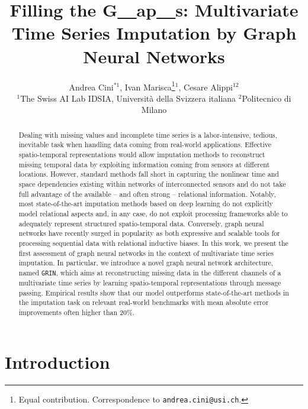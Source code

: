 \documentclass{article} \usepackage{iclr2022_conference,times}
\title{Filling the G\underline{~~}ap\underline{~~}s: Multivariate Time Series Imputation by Graph Neural Networks}
\author{Andrea Cini$^{*1}$, Ivan Marisca\thanks{Equal contribution. Correspondence to \texttt{andrea.cini@usi.ch}.}\hspace{1.5mm}$^{1}$, Cesare Alippi${}^{12}$\\
${}^1$The Swiss AI Lab IDSIA, Universit\`a della Svizzera italiana ${}^2$Politecnico di Milano
}
\newcommand{\GRIL}{\texttt{GRIN}}
\begin{document}
\maketitle

\begin{abstract}
Dealing with missing values and incomplete time series is a labor-intensive, tedious, inevitable task when handling data coming from real-world applications. Effective spatio-temporal representations would allow imputation methods to reconstruct missing temporal data by exploiting information coming from sensors at different locations. However, standard methods fall short in capturing the nonlinear time and space dependencies existing within networks of interconnected sensors and do not take full advantage of the available -- and often strong -- relational information. Notably, most state-of-the-art imputation methods based on deep learning do not explicitly model relational aspects and, in any case, do not exploit processing frameworks able to adequately represent structured spatio-temporal data.
Conversely, graph neural networks have recently surged in popularity as both expressive and scalable tools for processing sequential data with relational inductive biases. In this work, we present the first assessment of graph neural networks in the context of multivariate time series imputation. In particular, we introduce a novel graph neural network architecture, named \GRIL, which aims at reconstructing missing data in the different channels of a multivariate time series by learning spatio-temporal representations through message passing. Empirical results show that our model outperforms state-of-the-art methods in the imputation task on relevant real-world benchmarks with mean absolute error improvements often higher than $20\%$.
\end{abstract}

\section{Introduction}
\end{document}
